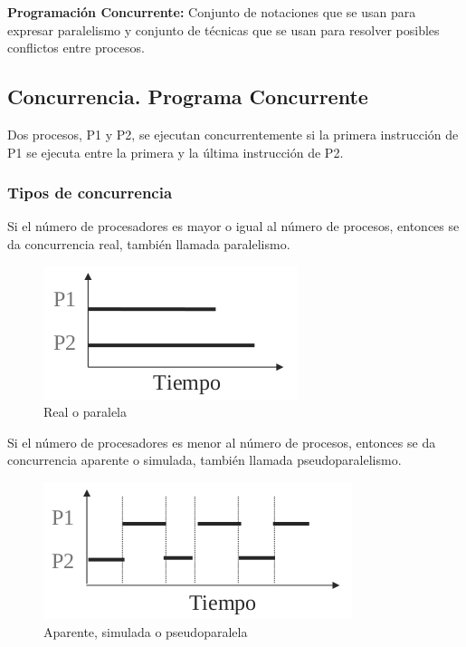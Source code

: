 \documentclass[spanish, 12pt]{article}
\begin{document}
			\textbf{Programación Concurrente:} Conjunto de notaciones que se usan para expresar paralelismo y conjunto de técnicas que se usan para resolver posibles conflictos entre procesos. 
			
			\newpage
			
		\subsection{Concurrencia. Programa Concurrente}
		
			Dos procesos, P1 y P2, se ejecutan concurrentemente si la primera instrucción de P1 se ejecuta entre la primera y la última instrucción de P2.\\
			
			\subsubsection{Tipos de concurrencia}
			
				Si el número de procesadores es mayor o igual al número de procesos, entonces se da concurrencia real, también llamada paralelismo.\\
			
				\begin{figure}[H]
					\centering
					\includegraphics[scale=0.63]{real}
					\caption{Real o paralela}
				\end{figure}
			
				Si el número de procesadores es menor al número de procesos, entonces se da concurrencia aparente o simulada, también llamada pseudoparalelismo.\\
			
				\begin{figure}[H]
					\centering
					\includegraphics[scale=0.63]{llike}
					\caption{Aparente, simulada o pseudoparalela}
				\end{figure}
				
\end{document}
